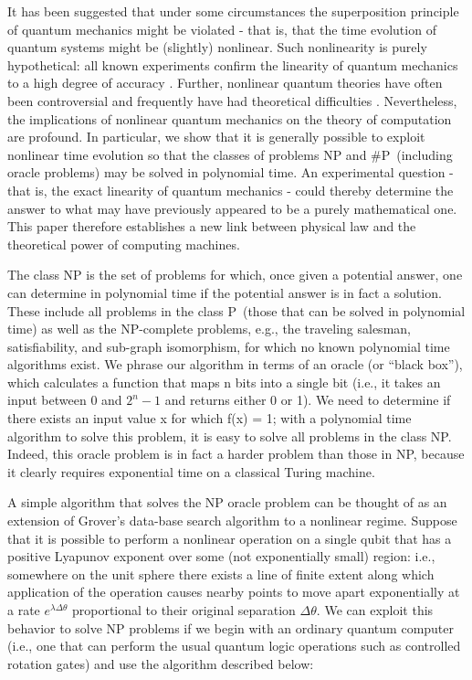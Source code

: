 \documentclass{article}
\begin{document}
It has been suggested \cite{Weinberg}\cite{Weinberg 2}\cite{Fivel}\cite{Levy}
\cite{Bertolami} that under some circumstances the superposition principle of
quantum mechanics might be violated - that is, that the time evolution of
quantum systems might be (slightly) nonlinear. Such nonlinearity is purely
hypothetical: all known experiments confirm the linearity of quantum mechanics
to a high degree of accuracy\cite{Majumder}\cite{Walsworth}\cite{Chupp}%
\cite{Bollinger}. Further, nonlinear quantum theories have often been
controversial and frequently have had theoretical difficulties\cite{Peres}
\cite{Polchinski}\cite{Gisin}. Nevertheless, the implications of nonlinear
quantum mechanics on the theory of computation are profound. In particular, we
show that it is generally possible to exploit nonlinear time evolution so that
the classes of problems NP and \#P\ (including oracle problems) may be solved
in polynomial time. An experimental question - that is, the exact linearity of
quantum mechanics - could thereby determine the answer to what may have
previously appeared to be a purely mathematical one. This paper therefore
establishes a new link between physical law and the theoretical power of
computing machines.

The class NP is the set of problems for which, once given a potential answer,
one can determine in polynomial time if the potential answer is in fact a
solution. These include all problems in the class P\ (those that can be solved
in polynomial time) as well as the NP-complete problems, e.g., the traveling
salesman, satisfiability, and sub-graph isomorphism, for which no known
polynomial time algorithms exist. We phrase our algorithm in terms of an
oracle (or ``black box''), which calculates a function that maps n bits into a
single bit (i.e., it takes an input between 0 and $2^{n}-1$ and returns either
0 or 1). We need to determine if there exists an input value x for which f(x)
= 1; with a polynomial time algorithm to solve this problem, it is easy to
solve all problems in the class NP. Indeed, this oracle problem is in fact a
harder problem than those in NP, because it clearly requires exponential time
on a classical Turing machine.

A simple algorithm that solves the NP oracle problem can be thought of as an
extension of Grover's data-base search algorithm\cite{Grover} to a nonlinear
regime. Suppose that it is possible to perform a nonlinear operation on a
single qubit that has a positive Lyapunov exponent over some (not
exponentially small) region: i.e., somewhere on the unit sphere there exists a
line of finite extent along which application of the operation causes nearby
points to move apart exponentially at a rate $e^{\lambda\Delta\theta}$
proportional to their original separation $\Delta\theta.$ We can exploit this
behavior to solve NP problems if we begin with an ordinary quantum computer
(i.e., one that can perform the usual quantum logic operations such as
controlled rotation gates) and use the algorithm described below:
\end{document}
